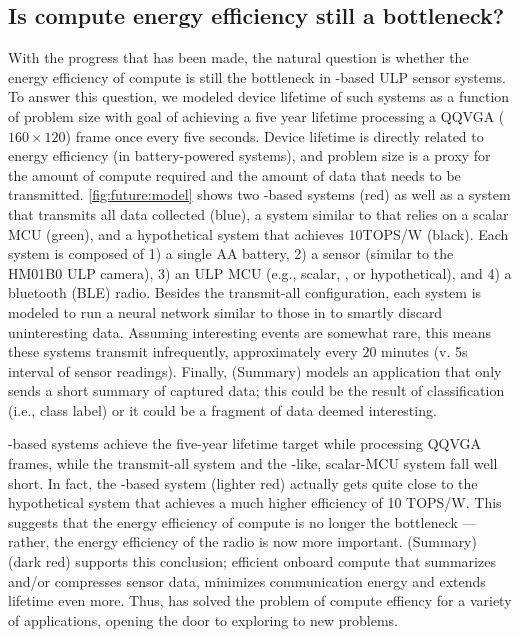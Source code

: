\figFutureModel
\subsection{Is compute energy efficiency still a bottleneck?}
With the progress that has been made, the natural question is whether the energy efficiency of compute is still the bottleneck in \riptide-based ULP sensor systems.
% 
To answer this question, we modeled device lifetime of such systems as a function of problem size with goal of achieving a five year lifetime processing a QQVGA ($160\times120$) frame once every five seconds.
%
Device lifetime is directly related to energy efficiency (in battery-powered systems), and problem size is a proxy for the amount of compute required and the amount of data that needs to be transmitted.
% 
\autoref{fig:future:model} shows two \riptide-based systems (red) as well as a system that transmits all data collected (blue), a system similar to \sonic that relies on a scalar MCU (green), and a hypothetical system that achieves 10TOPS/W (black).
% 
Each system is composed of 1) a single AA battery, 2) a sensor (similar to the HM01B0 ULP camera), 3) an ULP MCU (e.g., scalar, \riptide, or hypothetical), and 4) a bluetooth (BLE) radio.
% 
Besides the transmit-all configuration, each system is modeled to run a neural network similar to those in \sonic to smartly discard uninteresting data.
% 
Assuming interesting events are somewhat rare, this means these systems transmit infrequently, approximately every $20$ minutes (v. 5s interval of sensor readings).
% 
Finally, \riptide (Summary) models an application that only sends a short summary of captured data; this could be the result of classification (i.e., class label) or it could be a fragment of data deemed interesting.

\riptide-based systems achieve the five-year lifetime target while processing QQVGA frames, while the transmit-all system and the \sonic-like, scalar-MCU system fall well short.
% 
In fact, the \riptide-based system (lighter red) actually gets quite close to the hypothetical system that achieves a much higher efficiency of 10 TOPS/W.
% 
This suggests that the energy efficiency of compute is no longer the bottleneck --- rather, the energy efficiency of the radio is now more important.
% 
\riptide (Summary) (dark red) supports this conclusion; efficient onboard compute that summarizes and/or compresses sensor data, minimizes communication energy and extends lifetime even more. 
% 
Thus, \riptide has solved the problem of compute effiency for a variety of applications, opening the door to exploring to new problems.

